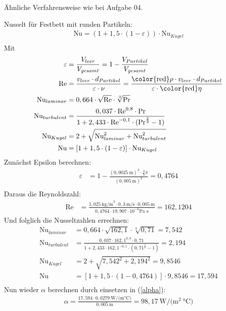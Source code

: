 \documentclass[a4paper,10pt]{article}
\begin{document}
Ähnliche Verfahrensweise wie bei Aufgabe 04. \ppbig

Nusselt für Festbett mit runden Partikeln: 
\begin{align*}
\text{Nu} = (1+1,5 \cdot (1-\varepsilon)) \cdot \text{Nu}_{Kugel} \\ 
\end{align*}
Mit
\reversemarginpar
\marginnote[Bei der Reynoldszahl muss man beachten, dass in der Formelsammlung die kinematische Viskosität gegeben ist, wir aber nur die dynamische Viskosität gegeben haben. Daher erweitern wir die Formel mit $\nu = \eta / \rho$]{}
\begin{align*}
\varepsilon &= \frac{V_{leer}}{V_{gesamt}} = 1 - \frac{V_{Partikel}}{V_{gesamt}} \\
\text{Re} &= \frac{v_{leer} \cdot d_{Partikel}}{\varepsilon \cdot \nu} = \frac{\text{\color{red}$\rho$}  \cdot v_{leer} \cdot d_{Partikel}}{\varepsilon \cdot \text{\color{red}$\eta$}}\\
\text{Nu}_{laminar} &= 0,664 \cdot \sqrt{\text{Re}} \cdot \sqrt[3]{\text{Pr}} \\
\text{Nu}_{turbulent} &= \frac{0,037 \cdot \text{Re}^{0,8} \cdot \text{Pr} }{1 + 2,433 \cdot \text{Re}^{-0,1} \cdot (\text{Pr}^{\frac{2}{3}} -1)} \\
\text{Nu}_{Kugel} &= 2 + \sqrt{ \text{Nu}_{laminar}^2 + \text{Nu}_{turbulent}^2  }\\
\text{Nu} &= [1 + 1,5 \cdot (1-\varepsilon)] \cdot \text{Nu}_{Kugel} \\
\end{align*}
Zunächst Epsilon berechnen:
\begin{align*}
\varepsilon &= 1 - \frac{(0,0025~\text{m})^3 \cdot \frac{4}{3} \pi}{(0,005 ~\text{m})^3} = 0,4764\\
\end{align*}
Daraus die Reynoldszahl:
\begin{align*}
\text{Re} &= \frac{1,025~ \text{kg/m}^3 \cdot 0,3~ \text{m/s} \cdot 0,005~\text{m}}{ 0,4764 \cdot 19,907 \cdot 10^{-6} \text{Pa s}} = 162,1204
\end{align*}
Und folglich die Nusseltzahlen errechnen:
\begin{align*}
\text{Nu}_{laminar} &= 0,664 \cdot \sqrt{162,1} \cdot \sqrt[3]{0,71} = 7,542 \\
\text{Nu}_{turbulent} &= \frac{0,037 \cdot 162,1^{0,8} \cdot 0,71 }{1 + 2,433 \cdot 162,1^{-0,1} \cdot (0,71^{\frac{2}{3}} -1)} = 2,194 \\
\text{Nu}_{Kugel} &= 2 + \sqrt{ 7,542^2 + 2,194^2  } = 9,8546\\
\text{Nu} &= [1 + 1,5 \cdot (1-0,4764)] \cdot 9,8546 = 17,594 \\
\end{align*}
Nun wieder $\alpha$ berechnen durch einsetzen in (\ref{alpha}):
\begin{align*}
\alpha =  \frac{17,594 \cdot 0,0279 ~\text{W/(m°C)}}{0,005 ~\text{m}} = 98,17 ~\text{W/(m$^2~$°C)}
\end{align*}
\end{document}
